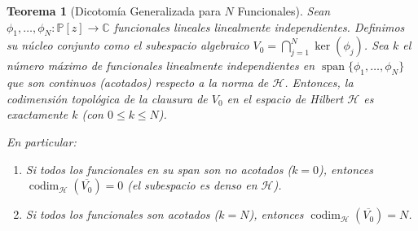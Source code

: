 \documentclass[12pt,a4paper]{article}
\newtheorem{theorem}{Teorema}
\theoremstyle{definition}
\theoremstyle{remark}
\begin{document}
\begin{theorem}[Dicotomía Generalizada para $N$ Funcionales]\label{thm:dicotomia_N_general}
	Sean $\phi_1, \dots, \phi_N : \mathbb{P}[z] \to \mathbb{C}$ funcionales lineales linealmente independientes. Definimos su núcleo conjunto como el subespacio algebraico $V_0 = \bigcap_{j=1}^N \ker(\phi_j)$.
	Sea $k$ el número máximo de funcionales linealmente independientes en $\operatorname{span}\{\phi_1, \dots, \phi_N\}$ que son continuos (acotados) respecto a la norma de $\mathcal{H}$.
	Entonces, la codimensión topológica de la clausura de $V_0$ en el espacio de Hilbert $\mathcal{H}$ es exactamente $k$ (con $0 \le k \le N$).

	En particular:
	\begin{enumerate}
		\item Si todos los funcionales en su span son no acotados ($k=0$), entonces $\operatorname{codim}_\mathcal{H}(\overline{V_0}) = 0$ (el subespacio es denso en $\mathcal{H}$).
		\item Si todos los funcionales son acotados ($k=N$), entonces $\operatorname{codim}_\mathcal{H}(\overline{V_0}) = N$.
	\end{enumerate}
\end{theorem}
\end{document}
